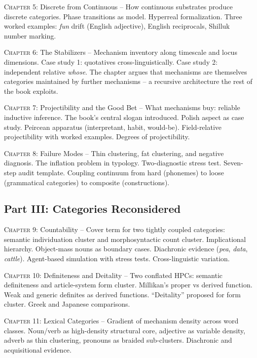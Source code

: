 \documentclass[11pt]{book}
\newcommand{\labelsc}[1]{{\mdseries\textsc{#1}}}
\begin{document}
\labelsc{Chapter 5:} Discrete from Continuous -- How continuous substrates produce discrete categories. Phase transitions as model. Hyperreal formalization. Three worked examples: \emph{fun} drift (English adjective), English reciprocals, Shilluk number marking.

\labelsc{Chapter 6:} The Stabilizers -- Mechanism inventory along timescale and locus dimensions. Case study 1: quotatives cross-linguistically. Case study 2: independent relative \emph{whose}. The chapter argues that mechanisms are themselves categories maintained by further mechanisms -- a recursive architecture the rest of the book exploits.

\labelsc{Chapter 7:} Projectibility and the Good Bet -- What mechanisms buy: reliable inductive inference. The book's central slogan introduced. Polish aspect as case study. Peircean apparatus (interpretant, habit, would-be). Field-relative projectibility with worked examples. Degrees of projectibility.

\labelsc{Chapter 8:} Failure Modes -- Thin clustering, fat clustering, and negative diagnosis. The inflation problem in typology. Two-diagnostic stress test. Seven-step audit template. Coupling continuum from hard (phonemes) to loose (grammatical categories) to composite (constructions).

\subsection*{Part III: Categories Reconsidered}

\labelsc{Chapter 9:} Countability -- Cover term for two tightly coupled categories: semantic individuation cluster and morphosyntactic count cluster. Implicational hierarchy. Object-mass nouns as boundary cases. Diachronic evidence (\emph{pea}, \emph{data}, \emph{cattle}). Agent-based simulation with stress tests. Cross-linguistic variation.

\labelsc{Chapter 10:} Definiteness and Deitality -- Two conflated HPCs: semantic definiteness and article-system form cluster. Millikan's proper vs derived function. Weak and generic definites as derived functions. \enquote{Deitality} proposed for form cluster. Greek and Japanese comparisons.

\labelsc{Chapter 11:} Lexical Categories -- Gradient of mechanism density across word classes. Noun/verb as high-density structural core, adjective as variable density, adverb as thin clustering, pronouns as braided sub-clusters. Diachronic and acquisitional evidence.
\end{document}
